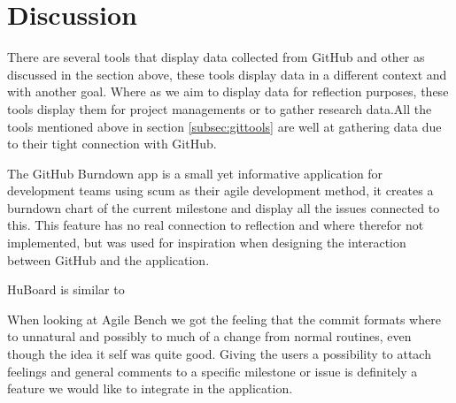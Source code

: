 \section{Discussion}
There are several tools that display data collected from GitHub and other as discussed in the section above, these tools display data in a different context and with another goal. Where as we aim to display data for reflection purposes, these tools display them for project managements or to gather research data.All the tools mentioned above in section \ref{subsec:gittools} are well at gathering data due to their tight connection with GitHub. 

The GitHub Burndown app is a small yet informative application for development teams using scum as their agile development method, it creates a burndown chart of the current milestone and display all the issues connected to this. This feature has no real connection to reflection and where therefor not implemented, but was used for inspiration when designing the interaction between GitHub and the application.

HuBoard is similar to 

When looking at Agile Bench we got the feeling that the commit formats where to unnatural and possibly to much of a change from normal routines, even though the idea it self was quite good. Giving the users a possibility to attach feelings and general comments to a specific milestone or issue is definitely a feature we would like to integrate in the application.